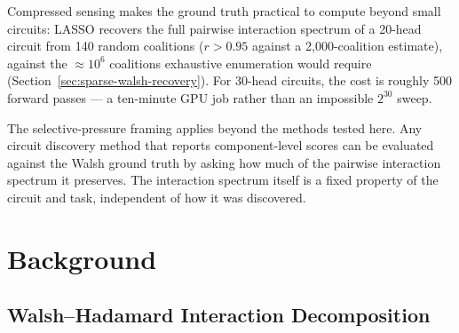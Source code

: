 \documentclass{article}
\begin{document}
Compressed sensing makes the ground truth practical to compute beyond
small circuits: LASSO recovers the full pairwise interaction spectrum of
a 20-head circuit from 140 random coalitions ($r > 0.95$ against a 2{,}000-coalition estimate), against the ${\approx}10^6$ coalitions exhaustive enumeration would require
(Section~\ref{sec:sparse-walsh-recovery}). For 30-head circuits, the
cost is roughly 500 forward passes --- a ten-minute GPU job rather than
an impossible $2^{30}$ sweep.

The selective-pressure framing applies beyond the methods tested here.
Any circuit discovery method that reports component-level scores can be
evaluated against the Walsh ground truth by asking how much of the
pairwise interaction spectrum it preserves. The interaction spectrum
itself is a fixed property of the circuit and task, independent of
how it was discovered.



%

\section{Background}
\label{sec:background}

\subsection{Walsh--Hadamard Interaction Decomposition}
\label{sec:walsh-decomposition}
\end{document}
